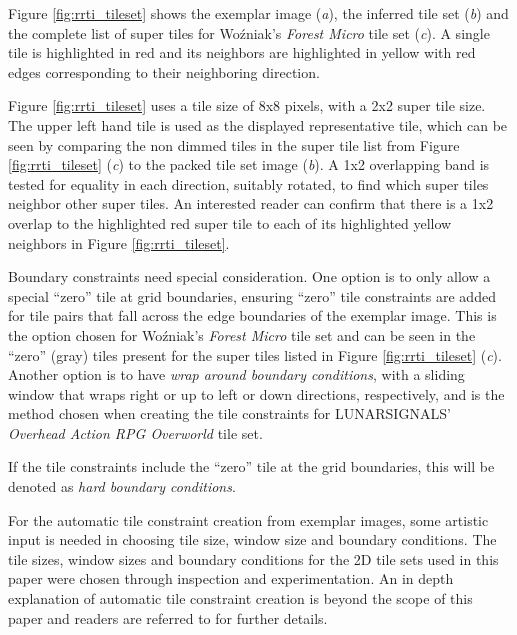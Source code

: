Figure \ref{fig:rrti_tileset} shows the exemplar image (\textit{a}), the inferred tile set (\textit{b}) and the complete list of super tiles
for Wo\'zniak's \textit{Forest Micro} tile set (\textit{c}).
A single tile is highlighted in red and its neighbors are highlighted in yellow with red edges corresponding to their neighboring direction.

Figure \ref{fig:rrti_tileset} uses a tile size of 8x8 pixels, with a 2x2 super tile size.
The upper left hand tile is used as the displayed representative tile, which can be seen by comparing the non dimmed tiles in the
super tile list from Figure \ref{fig:rrti_tileset} (\textit{c}) to the packed tile set image (\textit{b}).
A 1x2 overlapping band is tested for equality in each direction, suitably rotated, to find which super tiles neighbor other super tiles.
An interested reader can confirm that there is a 1x2 overlap to the highlighted red super tile to each of its highlighted yellow neighbors
in Figure \ref{fig:rrti_tileset}.

Boundary constraints need special consideration.
One option is to only allow a special ``zero'' tile at grid boundaries, ensuring ``zero'' tile constraints are added
for tile pairs that fall across the edge boundaries of the exemplar image.
This is the option chosen for Wo\'zniak's \textit{Forest Micro} tile set and can be seen in the ``zero'' (gray) tiles present for
the super tiles listed in Figure \ref{fig:rrti_tileset} (\textit{c}).
Another option is to have \textit{wrap around boundary conditions}, with a sliding window that wraps right or up to left or down directions, respectively,
and is the method chosen when creating the tile constraints for LUNARSIGNALS' \textit{Overhead Action RPG Overworld} tile set.

If the tile constraints include the ``zero'' tile at the grid boundaries, this will be denoted as \textit{hard boundary conditions}.


For the automatic tile constraint creation from exemplar images, some artistic input is needed in choosing tile size, window size and boundary conditions.
The tile sizes, window sizes and boundary conditions for the 2D tile sets used in this paper were chosen through inspection and experimentation.
An in depth explanation of automatic tile constraint creation is beyond the scope of this paper and readers are referred to \cite{Gumin_2016, Sherratt_2019, BorisTheBrave_wfc_2021} for further details.

